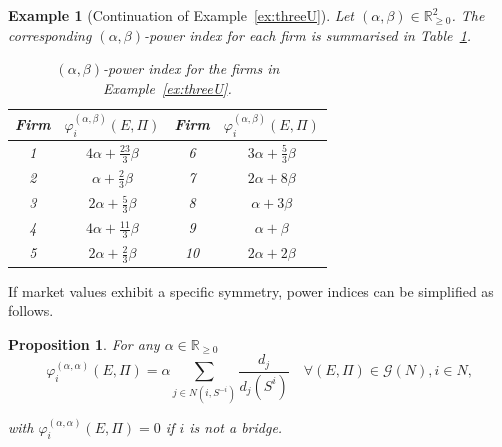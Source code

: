 \documentclass[preprint,11pt,authoryear]{elsarticle}
\renewcommand{\arraystretch}{1.2}
\newcommand{\dsum}{\displaystyle\sum}
\theoremstyle{plain}
\newtheorem{proposition}[theorem]{Proposition}
\newtheorem{example}[theorem]{Example}
\begin{document}
\begin{example}[Continuation of Example~\ref{ex:threeU}]
Let \( (\alpha, \beta) \in \mathbb{R}^2_{\geq 0} \). The corresponding \((\alpha,\beta)\)-power index for each firm is summarised in Table~\ref{tab:power_indices_example}.

\begin{table}[H]
\centering
\renewcommand{\arraystretch}{1.4}
\begin{tabular}{|c|c||c|c|}
\hline
Firm & \( \varphi^{(\alpha,\beta)}_i(E,\Pi) \) & Firm & \( \varphi^{(\alpha,\beta)}_i(E,\Pi) \) \\
\hline
1  & \( 4\alpha + \tfrac{23}{3}\beta \) & 6  & \( 3\alpha + \tfrac{5}{3}\beta \) \\
2  & \( \alpha + \tfrac{2}{3}\beta \)   & 7  & \( 2\alpha + 8\beta \) \\
3  & \( 2\alpha + \tfrac{5}{3}\beta \)  & 8  & \( \alpha + 3\beta \) \\
4  & \( 4\alpha + \tfrac{11}{3}\beta \) & 9  & \( \alpha + \beta \) \\
5  & \( 2\alpha + \tfrac{2}{3}\beta \)  & 10 & \( 2\alpha + 2\beta \) \\
\hline
\end{tabular}
\caption{\scriptsize \((\alpha,\beta)\)-power index for the firms in Example~\ref{ex:threeU}.}
\label{tab:power_indices_example}
\end{table}
\end{example}
If market values exhibit a specific symmetry, power indices can be simplified as follows.
\begin{proposition}
\label{prop10}
For any $\alpha\in\mathbb{R}_{\geq 0}$ 
\begin{equation*}
\varphi_i^{(\alpha,\alpha)}(E,\Pi)=\alpha \dsum_{j\in N(i,S^{-i})}\dfrac{d_j}{d_{j}(S^i)} \quad
\forall (E,\Pi)\in \mathcal{G}(N), i\in N,
\end{equation*}

with $\varphi_i^{(\alpha,\alpha)}(E,\Pi)=0$ if $i$ is not a bridge. 
\end{proposition}
\end{document}
